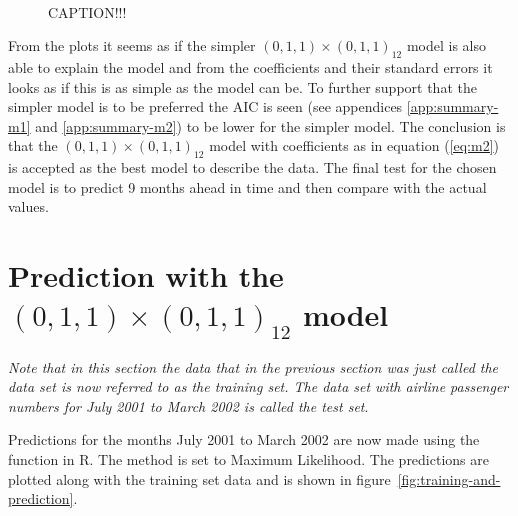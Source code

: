 \begin{figure}
{         \quad 
    }
    \mbox{%
    }
    \caption{CAPTION!!!}
    \label{fig:diagnostics-m2}
\end{figure}

From the plots it seems as if the simpler $(0,1,1)\times(0,1,1)_{12}$ model is also able to explain the model and from the coefficients and their standard errors it looks as if this is as simple as the model can be. To further support that the simpler model is to be preferred the AIC is seen (see appendices \ref{app:summary-m1} and \ref{app:summary-m2}) to be lower for the simpler model. The conclusion is that the $(0,1,1)\times(0,1,1)_{12}$ model with coefficients as in equation (\ref{eq:m2}) is accepted as the best model to describe the data. The final test for the chosen model is to predict 9 months ahead in time and then compare with the actual values.


\section*{Prediction with the $(0,1,1)\times(0,1,1)_{12}$ model}

\textit{Note that in this section the data that in the previous section was just called the data set is now referred to as the training set. The data set with airline passenger numbers for July 2001 to March 2002 is called the test set}.\par 

Predictions for the months July 2001 to March 2002 are now made using the  function in R. The method is set to Maximum Likelihood. The predictions are plotted along with the training set data and is shown in figure~\ref{fig:training-and-prediction}.\par

